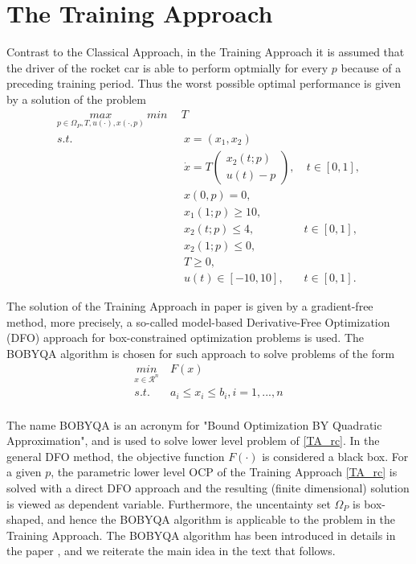 \documentclass  [
  paper    = a4,
  BCOR     = 10mm,
  twoside,
  fontsize = 12pt,
  fleqn,
  toc      = bibnumbered,
  toc      = listofnumbered,
  numbers  = noendperiod,
  headings = normal,
  listof   = leveldown,
  version  = 3.03
]                                       {scrreprt}
\newcommand{\<}{\langle}
\renewcommand{\>}{\rangle}
\begin{document}
   \section{The Training Approach}
   Contrast to the Classical Approach, in the Training Approach it is assumed that the driver of the rocket car is able to perform optmially for every $p$ because of a preceding training period. Thus the worst possible optimal performance is given by a solution of the problem
   \begin{subequations}
   	\begin{align}
   	\underset{p \in \Omega_P, T, u(\cdot), x(\cdot,p)}{max}  \ 	\underset{}{min} \   & \  T \\ 
   	s.t.  & \ \ x = (x_1, x_2)   \label{ta_rc_x} \\ 
   	& \ \  \dot{x} = T  \begin{pmatrix}  x_2(t;p) \\ u(t)-p   \end{pmatrix}, & \ t \in [0,1],  \label{ta_rc_partial} \\
   	& \ \ x(0,p) = 0, \label{ta_rc_t0}\\
   	& \ \ x_1(1;p) \geq 10, \label{ta_rc_x1_t1} \\
   	& \ \ x_2(t;p) \leq 4, & t \in [0,1], \label{ta_rc_x2_tc} \\
   	& \ \ x_2(1;p) \leq 0, \label{ta_rc_x2_t1}  \\
   	& \ \ T \geq 0, \\
   	& \ \ u(t) \in [-10, 10], & t \in [0,1]. 
   	\end{align}
   	\label{TA_rc}
   \end{subequations}
   
   The solution of the Training Approach in paper \cite{MatSch22} is given by a gradient-free method, more precisely, a so-called model-based Derivative-Free Optimization (DFO) approach for box-constrained optimization problems is used. The BOBYQA algorithm is chosen for such approach to solve problems of the form
   \begin{equation}
   \begin{aligned}
   \underset{x \in \mathcal{R}^n}{min} & \  F(x)  \\ 
   s.t.  & \ a_i \leq x_i \leq b_i, i = 1, ..., n \\
   \end{aligned}
   \label{DFO_bc}
   \end{equation}
   
   The name BOBYQA is an acronym for "Bound Optimization BY Quadratic Approximation", and is used to solve lower level problem of \ref{TA_rc}. In the general DFO method, the objective function $F(\cdot)$ is considered a black box. For a given $p$, the parametric lower level OCP of the Training Approach \ref{TA_rc} is solved with a direct DFO approach and the resulting (finite dimensional) solution is viewed as dependent variable. Furthermore, the uncentainty set $\Omega_P$ is box-shaped, and hence the BOBYQA algorithm is applicable to the problem in the Training Approach. The BOBYQA algorithm has been introduced in details in the paper \cite{MicPow09}, and we reiterate the main idea in the text that follows.  
   
\end{document}
